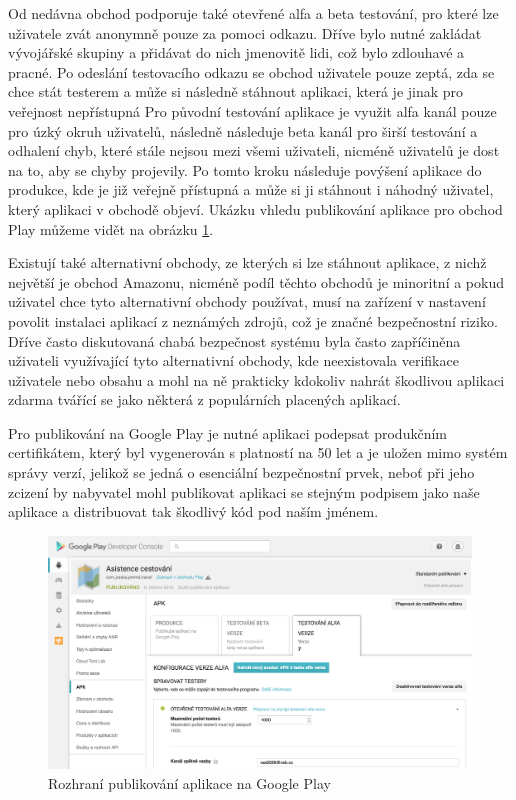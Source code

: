 \documentclass[czech,master,public,dept460,male,java,cpdeclaration]{diploma}
\begin{document}
Od nedávna obchod podporuje také otevřené alfa a beta testování, pro které lze uživatele zvát anonymně
pouze za pomoci odkazu. Dříve bylo nutné zakládat vývojářské skupiny a přidávat do nich jmenovitě
lidi, což bylo zdlouhavé a pracné. Po odeslání testovacího odkazu se obchod uživatele pouze zeptá,
zda se chce stát testerem a může si následně stáhnout aplikaci, která je jinak pro veřejnost nepřístupná
Pro původní testování aplikace je využit alfa kanál pouze pro úzký okruh uživatelů, následně následuje beta
kanál pro širší testování a odhalení chyb, které stále nejsou mezi všemi uživateli, nicméně uživatelů je
dost na to, aby se chyby projevily. Po tomto kroku následuje povýšení aplikace do produkce, kde je již
veřejně přístupná a může si ji stáhnout i náhodný uživatel, který aplikaci v obchodě objeví. Ukázku
vhledu publikování aplikace pro obchod Play můžeme vidět na obrázku \ref{fig:playconsole}.

Existují také alternativní obchody, ze kterých si lze stáhnout aplikace, z nichž největší je obchod Amazonu,
nicméně podíl těchto obchodů je minoritní a pokud uživatel chce tyto alternativní obchody používat,
musí na zařízení v nastavení povolit instalaci aplikací z neznámých zdrojů, což je značné bezpečnostní
riziko. Dříve často diskutovaná chabá bezpečnost systému byla často zapříčiněna uživateli využívající
tyto alternativní obchody, kde neexistovala verifikace uživatele nebo obsahu a mohl na ně prakticky
kdokoliv nahrát škodlivou aplikaci zdarma tvářící se jako některá z populárních placených aplikací.

Pro publikování na Google Play je nutné aplikaci podepsat produkčním certifikátem, který byl
vygenerován s platností na 50 let a je uložen mimo systém správy verzí, jelikož se jedná o esenciální
bezpečnostní prvek, neboť při jeho zcizení by nabyvatel mohl publikovat aplikaci se stejným podpisem
jako naše aplikace a distribuovat tak škodlivý kód pod naším jménem.

\begin{figure}[H]
        \centering
                \includegraphics[scale=0.5]{img/playconsole.png}
        \caption{Rozhraní publikování aplikace na Google Play}
        \label{fig:playconsole}
\end{figure}
\end{document}
